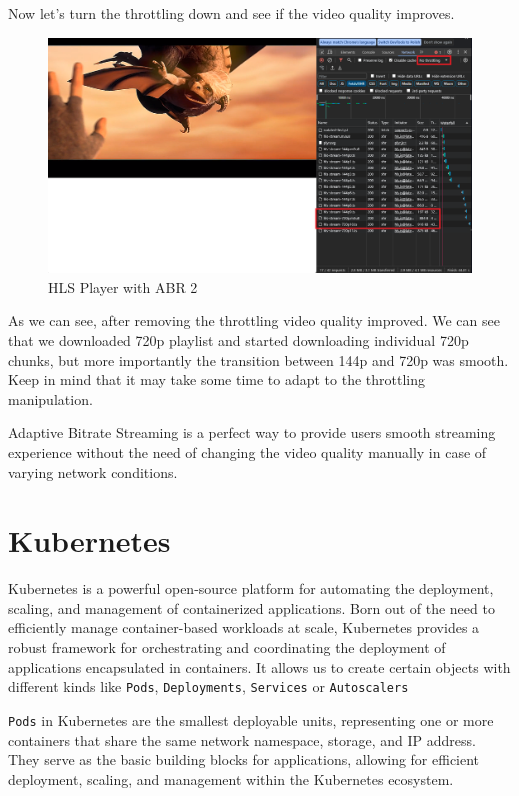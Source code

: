 \documentclass{article}
\begin{document}
Now let's turn the throttling down and see if the video quality
improves.

\begin{figure}[H]
\centering
\includegraphics[width=\textwidth]{images/6_hls_player_with_abr_2.png}
\caption{HLS Player with ABR 2}
\end{figure}

As we can see, after removing the throttling video quality improved. We
can see that we downloaded 720p playlist and started downloading
individual 720p chunks, but more importantly the transition between 144p
and 720p was smooth. Keep in mind that it may take some time to adapt to
the throttling manipulation.

Adaptive Bitrate Streaming is a perfect way to provide users smooth
streaming experience without the need of changing the video quality
manually in case of varying network conditions.

\section{Kubernetes}\label{kubernetes}

Kubernetes is a powerful open-source platform for automating the
deployment, scaling, and management of containerized applications. Born
out of the need to efficiently manage container-based workloads at
scale, Kubernetes provides a robust framework for orchestrating and
coordinating the deployment of applications encapsulated in containers.
It allows us to create certain objects with different kinds like
\texttt{Pods}, \texttt{Deployments}, \texttt{Services} or
\texttt{Autoscalers}

\texttt{Pods} in Kubernetes are the smallest deployable units,
representing one or more containers that share the same network
namespace, storage, and IP address. They serve as the basic building
blocks for applications, allowing for efficient deployment, scaling, and
management within the Kubernetes ecosystem.
\end{document}
